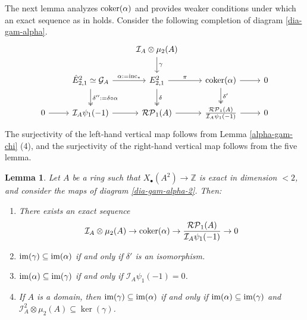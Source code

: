 \documentclass[11pt]{amsart}
\theoremstyle{definition}
\theoremstyle{plain}
\newtheorem{lem}[ntn]{Lemma}
\numberwithin{equation}{section}
\newcommand{\z}{\mathbb{Z}}
\newcommand{\GG}{\mathcal{G}}
\newcommand{\II}{\mathcal{I}}
\newcommand{\RP}{\mathcal{RP}}
\newcommand{\im}{{\rm im}}
\newcommand{\inc}{{\rm inc}}
\newcommand{\coker}{{\rm coker}}
\begin{document}
The next lemma analyzes $\coker(\alpha)$ and provides weaker conditions under which an exact sequence as in \cite[Theorem 6.6]{B-E--2023} holds. Consider the following completion of diagram \eqref{dia-gam-alpha}.
\begin{equation}\label{dia-gam-alpha-2}
\begin{tikzcd}
& & \II_A\otimes\mu_2(A)\ar[d,"\gamma"] & & \\
& \hat{E}^2_{2,1}\simeq\GG_A \ar[r,"\alpha:=\inc_*"]\ar[d,twoheadrightarrow,"\delta'':=\delta\circ\alpha"] & E^2_{2,1} \ar[r,"\pi"]\ar[d,twoheadrightarrow,"\delta"] & \coker(\alpha)\ar[r]\ar[d,twoheadrightarrow,"\delta'"] & 0\\
0 \ar[r] & \II_A\psi_1(-1)\ar[r] & \RP_1(A)\ar[r] & \frac{\RP_1(A)}{\II_A\psi_1(-1)}\ar[r] & 0
\end{tikzcd}
\end{equation}
The surjectivity of the left-hand vertical map follows from Lemma \ref{alpha-gam-chi} (4), and the surjectivity of the right-hand vertical map follows from the five lemma.
\begin{lem}\label{thm-main}
    Let $A$ be a ring such that $X_{\bullet}(A^2)\to\z$ is exact in dimension $<2$, and consider the maps of diagram \eqref{dia-gam-alpha-2}. Then:
    \begin{enumerate}
        \item There exists an exact sequence
        \[
            \II_A\otimes\mu_2(A)\to\coker(\alpha)\to\frac{\RP_1(A)}{\II_A\psi_1(-1)}\to 0
        \]
        \item $\im(\gamma)\subseteq\im(\alpha)$ if and only if $\delta'$ is an isomorphism.
        \item $\im(\alpha)\subseteq\im(\gamma)$ if and only if $\II_A\psi_1(-1)=0$.
        \item If $A$ is a domain, then $\im(\gamma)\subseteq\im(\alpha)$ if and only if $\im(\alpha)\subseteq\im(\gamma)$ and $\II_A^2\otimes\mu_2(A)\subseteq\ker(\gamma)$.
    \end{enumerate}
\end{lem}
\end{document}
